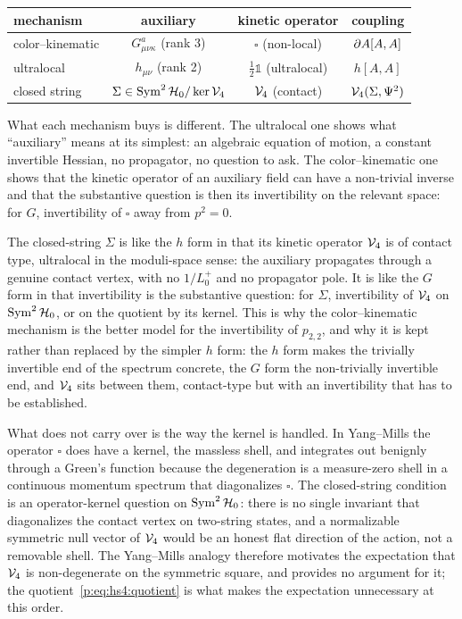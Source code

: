 \begin{center}
  \small
  \begin{tabular}{lccc}
    \toprule
    mechanism & auxiliary & kinetic operator & coupling \\
    \midrule
    color--kinematic & $G^a_{\mu\nu\kappa}$ (rank 3) & $\square$ (non-local) & $\partial A [A, A]$ \\
    ultralocal & $h_{\mu\nu}$ (rank 2) & $\frac12 \mathbb 1$ (ultralocal) & $h [A, A]$ \\
    closed string & $\Sigma \in \operatorname{Sym}^2 {\mathcal{H}}_0 / \ker {\mathcal{V}}_4$ & ${\mathcal{V}}_4$ (contact) & ${\mathcal{V}}_4(\Sigma, \Psi^2)$ \\
    \bottomrule
  \end{tabular}
\end{center}

What each mechanism buys is different.
The ultralocal one shows what \enquote{auxiliary} means at its simplest: an algebraic equation of motion, a constant invertible Hessian, no propagator, no question to ask.
The color--kinematic one shows that the kinetic operator of an auxiliary field can have a non-trivial inverse and that the substantive question is then its invertibility on the relevant space: for $G$, invertibility of $\square$ away from $p^2=0$.

The closed-string $\Sigma$ is like the $h$ form in that its kinetic operator ${\mathcal{V}}_4$ is of contact type, ultralocal in the moduli-space sense: the auxiliary propagates through a genuine contact vertex, with no $1/L_0^+$ and no propagator pole.
It is like the $G$ form in that invertibility is the substantive question: for $\Sigma$, invertibility of ${\mathcal{V}}_4$ on $\operatorname{Sym}^2{\mathcal{H}}_0$, or on the quotient by its kernel.
This is why the color--kinematic mechanism is the better model for the invertibility of $p_{2,2}$, and why it is kept rather than replaced by the simpler $h$ form: the $h$ form makes the trivially invertible end of the spectrum concrete, the $G$ form the non-trivially invertible end, and ${\mathcal{V}}_4$ sits between them, contact-type but with an invertibility that has to be established.

What does not carry over is the way the kernel is handled.
In Yang--Mills the operator $\square$ does have a kernel, the massless shell, and integrates out benignly through a Green's function because the degeneration is a measure-zero shell in a continuous momentum spectrum that diagonalizes $\square$.
The closed-string condition is an operator-kernel question on $\operatorname{Sym}^2{\mathcal{H}}_0$: there is no single invariant that diagonalizes the contact vertex on two-string states, and a normalizable symmetric null vector of ${\mathcal{V}}_4$ would be an honest flat direction of the action, not a removable shell.
The Yang--Mills analogy therefore motivates the expectation that ${\mathcal{V}}_4$ is non-degenerate on the symmetric square, and provides no argument for it; the quotient~\eqref{p:eq:hs4:quotient} is what makes the expectation unnecessary at this order.


